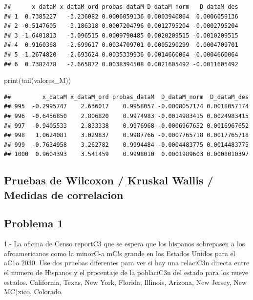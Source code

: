 \documentclass[
]{article}
\newenvironment{Shaded}{\begin{snugshade}}{\end{snugshade}}
\newcommand{\FunctionTok}[1]{\textcolor[rgb]{0.00,0.00,0.00}{#1}}
\newcommand{\NormalTok}[1]{#1}
\begin{document}
\begin{verbatim}
##      x_dataM x_dataM_ord probas_dataM D_dataM_norm   D_dataM_des
## 1  0.7385227   -3.236082 0.0006059136 0.0003940864  0.0006059136
## 2 -0.5147605   -3.186318 0.0007204796 0.0012795204 -0.0002795204
## 3 -1.6401813   -3.096515 0.0009790485 0.0020209515 -0.0010209515
## 4  0.9160368   -2.699617 0.0034709701 0.0005290299  0.0004709701
## 5 -1.2674820   -2.693624 0.0035339936 0.0014660064 -0.0004660064
## 6  0.7382478   -2.665872 0.0038394508 0.0021605492 -0.0011605492
\end{verbatim}

\begin{Shaded}
\begin{Highlighting}[]
\FunctionTok{print}\NormalTok{(}\FunctionTok{tail}\NormalTok{(valores\_M))}
\end{Highlighting}
\end{Shaded}

\begin{verbatim}
##         x_dataM x_dataM_ord probas_dataM  D_dataM_norm  D_dataM_des
## 995  -0.2995747    2.636017    0.9958057 -0.0008057174 0.0018057174
## 996  -0.6456850    2.806820    0.9974983 -0.0014983415 0.0024983415
## 997  -0.9405533    2.833338    0.9976968 -0.0006967652 0.0016967652
## 998   1.0624081    3.029837    0.9987766 -0.0007765718 0.0017765718
## 999  -0.7634958    3.262782    0.9994484 -0.0004483775 0.0014483775
## 1000  0.9604393    3.541459    0.9998010  0.0001989603 0.0008010397
\end{verbatim}

\hypertarget{pruebas-de-wilcoxon-kruskal-wallis-medidas-de-correlacion}{%
\subsection{Pruebas de Wilcoxon / Kruskal Wallis / Medidas de
correlacion}\label{pruebas-de-wilcoxon-kruskal-wallis-medidas-de-correlacion}}

\hypertarget{problema-1}{%
\subsection{Problema 1}\label{problema-1}}

1.- La oficina de Censo reportC3 que se espera que los hispanos
sobrepasen a los afroamericanos como la minorC-a mC!s grande en los
Estados Unidos para el aC1o 2030. Use dos pruebas diferentes para ver si
hay una relaciC3n directa entre el numero de Hispanos y el procentaje de
la poblaciC3n del estado para los nueve estados. California, Texas, New
York, Florida, Illinois, Arizona, New Jersey, New MC)xico, Colorado.
\end{document}
